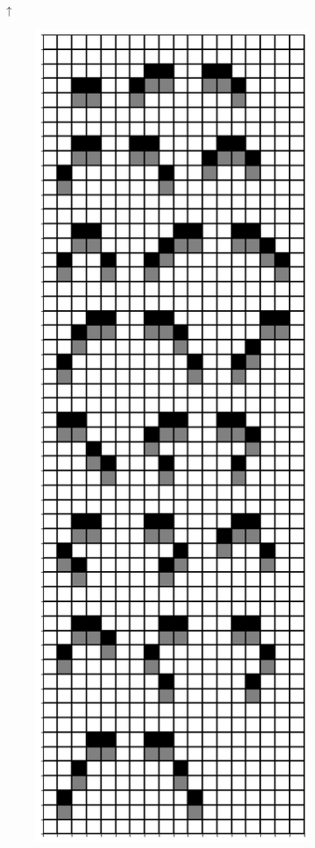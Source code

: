 \documentclass[12pt]{article}
\numberwithin{figure}{section} %
\begin{document}
\begin{figure}[H]
	\begin{center}
		{\Huge$\uparrow$}
	\end{center}
 	\begin{subfigure}{0.49\textwidth}
     		\centering
     		\includegraphics[width=\linewidth]{Section4/1.0}

\end{subfigure}
\end{figure}
\end{document}
